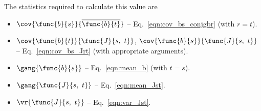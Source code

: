 The statistics required to calculate this value are

\begin{itemize}
	\item [] $\cov{\func{b}{s}}{\overline{\func{b}{t}}}$ -- Eq.~\ref{eqn:cov_bs_conjgbr} (with $r = t$).
	\item [] $\cov{\func{b}{t}}{\func{J}{s,\ t}}$, $\cov{\func{b}{s}}{\func{J}{s,\ t}}$ -- Eq.~\ref{eqn:cov_bs_Jrt} (with appropriate arguments).
	\item [] $\gang{\func{b}{s}}$ -- Eq.~\ref{eqn:mean_b} (with $t = s$).
	\item [] $\gang{\func{J}{s,\ t}}$ -- Eq.~\ref{eqn:mean_Jst}.
	\item [] $\vr{\func{J}{s,\ t}}$ -- Eq.~\ref{eqn:var_Jst}.
\end{itemize}

